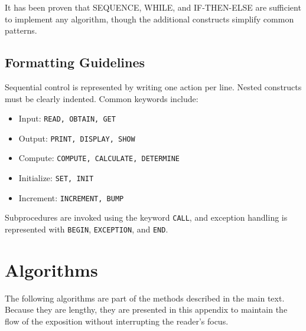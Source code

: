 \quad It has been proven that SEQUENCE, WHILE, and IF-THEN-ELSE are sufficient to implement any algorithm, though the additional constructs simplify common patterns.  

\subsection{Formatting Guidelines}
\quad Sequential control is represented by writing one action per line. Nested constructs must be clearly indented. Common keywords include:  
\begin{itemize}
	\item Input: \texttt{READ, OBTAIN, GET}  
	\item Output: \texttt{PRINT, DISPLAY, SHOW}  
	\item Compute: \texttt{COMPUTE, CALCULATE, DETERMINE}  
	\item Initialize: \texttt{SET, INIT}  
	\item Increment: \texttt{INCREMENT, BUMP}  
\end{itemize}

\quad Subprocedures are invoked using the keyword \texttt{CALL}, and exception handling is represented with \texttt{BEGIN}, \texttt{EXCEPTION}, and \texttt{END}.  

\section{Algorithms}
\label{appendix:supporting-algorithms}

\quad The following algorithms are part of the methods described in the main text. 
Because they are lengthy, they are presented in this appendix to maintain the 
flow of the exposition without interrupting the reader’s focus.



